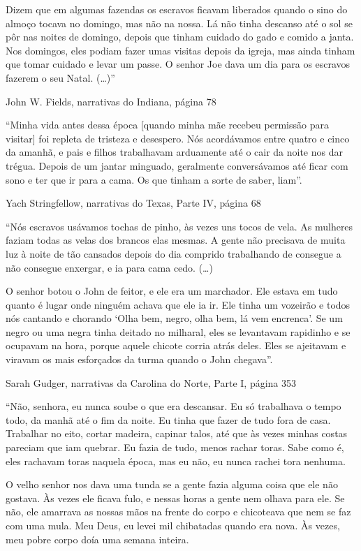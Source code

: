Dizem que em algumas fazendas os escravos ficavam liberados quando o
sino do almoço tocava no domingo, mas não na nossa. Lá não tinha
descanso até o sol se pôr nas noites de domingo, depois que tinham
cuidado do gado e comido a janta. Nos domingos, eles podiam fazer umas
visitas depois da igreja, mas ainda tinham que tomar cuidado e levar um
passe. O senhor Joe dava um dia para os escravos fazerem o seu Natal.
(\ldots{})''

John W. Fields, narrativas do Indiana, página 78

``Minha vida antes dessa época {[}quando minha mãe recebeu permissão
para visitar{]} foi repleta de tristeza e desespero. Nós acordávamos
entre quatro e cinco da amanhã, e pais e filhos trabalhavam arduamente
até o cair da noite nos dar trégua. Depois de um jantar minguado,
geralmente conversávamos até ficar com sono e ter que ir para a cama. Os
que tinham a sorte de saber, liam''.

Yach Stringfellow, narrativas do Texas, Parte IV, página 68

``Nós escravos usávamos tochas de pinho, às vezes uns tocos de vela. As
mulheres faziam todas as velas dos brancos elas mesmas. A gente não
precisava de muita luz à noite de tão cansados depois do dia comprido
trabalhando de consegue a não consegue enxergar, e ia para cama cedo.
(\ldots{})

O senhor botou o John de feitor, e ele era um marchador. Ele estava em
tudo quanto é lugar onde ninguém achava que ele ia ir. Ele tinha um
vozeirão e todos nós cantando e chorando `Olha bem, negro, olha bem, lá
vem encrenca'. Se um negro ou uma negra tinha deitado no milharal, eles
se levantavam rapidinho e se ocupavam na hora, porque aquele chicote
corria atrás deles. Eles se ajeitavam e viravam os mais esforçados da
turma quando o John chegava''.

Sarah Gudger, narrativas da Carolina do Norte, Parte I, página 353

``Não, senhora, eu nunca soube o que era descansar. Eu só trabalhava o
tempo todo, da manhã até o fim da noite. Eu tinha que fazer de tudo fora
de casa. Trabalhar no eito, cortar madeira, capinar talos, até que às
vezes minhas costas pareciam que iam quebrar. Eu fazia de tudo, menos
rachar toras. Sabe como é, eles rachavam toras naquela época, mas eu
não, eu nunca rachei tora nenhuma.

O velho senhor nos dava uma tunda se a gente fazia alguma coisa que ele
não gostava. Às vezes ele ficava fulo, e nessas horas a gente nem olhava
para ele. Se não, ele amarrava as nossas mãos na frente do corpo e
chicoteava que nem se faz com uma mula. Meu Deus, eu levei mil
chibatadas quando era nova. Às vezes, meu pobre corpo doía uma semana
inteira.

